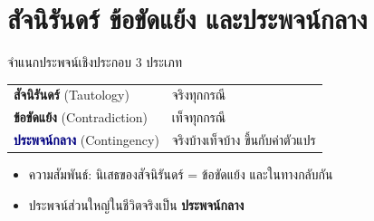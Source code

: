 \section{สัจนิรันดร์ ข้อขัดแย้ง และประพจน์กลาง}

\begin{frame}{จำแนกประพจน์เชิงประกอบ 3 ประเภท}
  \begin{block}{}
  \begin{tabular}{@{}p{} p{}@{}}
    \textbf{\textcolor{Tgreen}{สัจนิรันดร์}} (Tautology) & จริงทุกกรณี \\[0.4em]
    \textbf{\textcolor{Fred}{ข้อขัดแย้ง}} (Contradiction) & เท็จทุกกรณี \\[0.4em]
    \textbf{\textcolor{navy}{ประพจน์กลาง}} (Contingency) & จริงบ้างเท็จบ้าง ขึ้นกับค่าตัวแปร \\
  \end{tabular}
  \end{block}
  \vspace{0.5em}
  \begin{itemize}
    \item ความสัมพันธ์: นิเสธของสัจนิรันดร์ = ข้อขัดแย้ง และในทางกลับกัน
    \item ประพจน์ส่วนใหญ่ในชีวิตจริงเป็น \textbf{ประพจน์กลาง}
  \end{itemize}
\end{frame}

